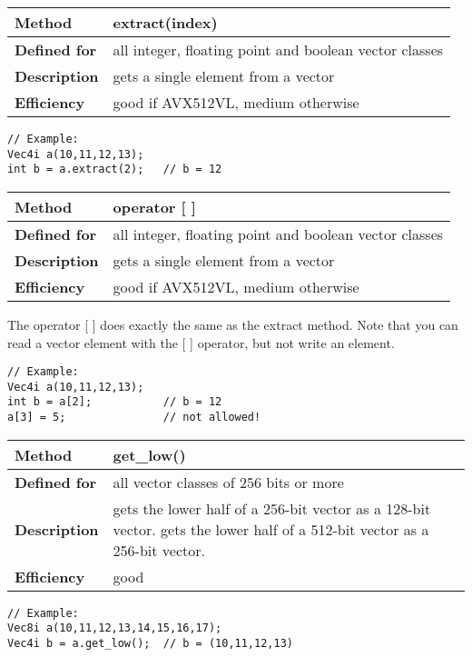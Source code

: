 \documentclass[vcl_manual.tex]{subfiles}
\begin{document}
\begin{tabular}{|p{25mm}|p{100mm}|}
\hline
\bfseries Method & extract(index) \\ \hline
\bfseries Defined for & all integer, floating point and boolean vector classes \\ \hline
\bfseries Description & gets a single element from a vector \\ \hline
\bfseries Efficiency & good if AVX512VL, medium otherwise \\ \hline
\end{tabular}
\begin{lstlisting}[frame=none]
// Example:
Vec4i a(10,11,12,13);
int b = a.extract(2);   // b = 12
\end{lstlisting}

\begin{tabular}{|p{25mm}|p{100mm}|}
\hline
\bfseries Method & operator [ ] \\ \hline
\bfseries Defined for & all integer, floating point and boolean vector classes \\ \hline
\bfseries Description & gets a single element from a vector \\ \hline
\bfseries Efficiency & good if AVX512VL, medium otherwise \\ \hline
\end{tabular}

The operator [ ] does exactly the same as the extract method. Note that you can read a vector element with the [ ] operator, but not write an element.

\begin{lstlisting}[frame=none]
// Example:
Vec4i a(10,11,12,13);
int b = a[2];           // b = 12
a[3] = 5;               // not allowed!
\end{lstlisting}

\begin{tabular}{|p{25mm}|p{100mm}|}
\hline
\bfseries Method & get\_low() \\ \hline
\bfseries Defined for & all vector classes of 256 bits or more \\ \hline
\bfseries Description & gets the lower half of a 256-bit vector as a 128-bit vector.\newline
gets the lower half of a 512-bit vector as a 256-bit vector.
 \\ \hline
\bfseries Efficiency & good \\ \hline
\end{tabular}
\begin{lstlisting}[frame=none]
// Example:
Vec8i a(10,11,12,13,14,15,16,17);
Vec4i b = a.get_low();  // b = (10,11,12,13)
\end{lstlisting}
\end{document}
